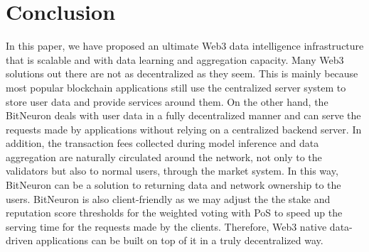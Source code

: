 \documentclass[11pt,letterpaper]{article}
\begin{document}
\section{Conclusion}
In this paper, we have proposed an ultimate Web3 data intelligence infrastructure that is scalable and with data learning and aggregation capacity. Many Web3 solutions out there are not as decentralized as they seem. This is mainly because most popular blockchain applications still use the centralized server system to store user data and provide services around them. On the other hand, the BitNeuron deals with user data in a fully decentralized manner and can serve the requests made by applications without relying on a centralized backend server. In addition, the transaction fees collected during model inference and data aggregation are naturally circulated around the network, not only to the validators but also to normal users, through the market system. In this way, BitNeuron can be a solution to returning data and network ownership to the users. BitNeuron is also client-friendly as we may adjust the the stake and reputation score thresholds for the weighted voting with PoS to speed up the serving time for the requests made by the clients. Therefore, Web3 native data-driven applications can be built on top of it in a truly decentralized way.



\end{document}
